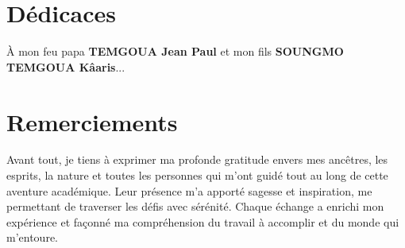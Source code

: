 \documentclass[a4paper,12pt]{report}
\begin{document}
\cleardoublepage
{}
\chapter*{Dédicaces}
À mon feu papa \textbf{TEMGOUA Jean Paul} et mon fils \textbf{\uppercase{soungmo temgoua} Kâaris}...

\cleardoublepage
{}
\chapter*{Remerciements}
\vspace{-2.1em}
\setlength{\parskip}{0.1em} %

Avant tout, je tiens à exprimer ma profonde gratitude envers mes ancêtres, les esprits, la nature et toutes les personnes qui m'ont guidé tout au long de cette aventure académique. Leur présence m'a apporté sagesse et inspiration, me permettant de traverser les défis avec sérénité. Chaque échange a enrichi mon expérience et façonné ma compréhension du travail à accomplir et du monde qui m'entoure.
\end{document}
